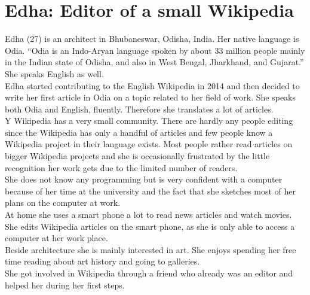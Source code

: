 \section{Edha: Editor of a small Wikipedia}
Edha (27) is an architect in Bhubaneswar, Odisha, India. Her native language is Odia. ``Odia is an Indo-Aryan language spoken by about 33 million people mainly in the Indian state of Odisha, and also in West Bengal, Jharkhand, and Gujarat.'' \citep{odia} She speaks English as well.\\
Edha started contributing to the English Wikipedia in 2014 and then decided to write her first article in Odia on a topic related to her field of work. She speaks both Odia and English, fluently. Therefore she translates a lot of articles. \\
Y Wikipedia has a very small community. There are hardly any people editing since the Wikipedia has only a handful of articles and few people know a Wikipedia project in their language exists. Most people rather read articles on bigger Wikipedia projects and she is occasionally frustrated by the little recognition her work gets due to the limited number of readers. \\
She does not know any programming but is very confident with a computer because of her time at the university and the fact that she sketches most of her plans  on the computer at work. \\
At home she uses a smart phone a lot to read news articles and watch movies. She edits Wikipedia articles on the smart phone, as she is only able to access a computer at her work place. \\  
Beside architecture she is mainly interested in art. She enjoys spending her free time reading about art history and going to galleries. \\
She got involved in Wikipedia through a friend who already was an editor and helped her during her first steps.

